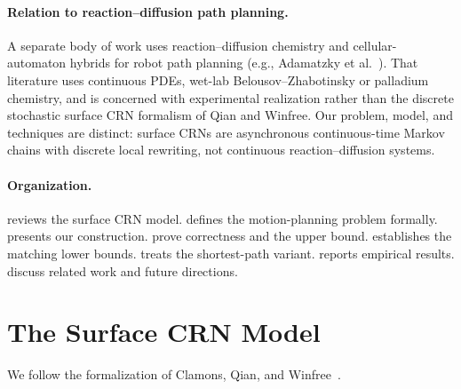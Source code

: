 \documentclass[11pt]{article}
\theoremstyle{plain}
\theoremstyle{definition}
\theoremstyle{remark}
\begin{document}
\paragraph{Relation to reaction--diffusion path planning.} A separate body of work uses reaction--diffusion chemistry and cellular-automaton hybrids for robot path planning (e.g., Adamatzky et al.~\cite{adamatzky2003,adamatzky2005}). That literature uses continuous PDEs, wet-lab Belousov--Zhabotinsky or palladium chemistry, and is concerned with experimental realization rather than the discrete stochastic surface CRN formalism of Qian and Winfree. Our problem, model, and techniques are distinct: surface CRNs are asynchronous continuous-time Markov chains with discrete local rewriting, not continuous reaction--diffusion systems.

\paragraph{Organization.}  reviews the surface CRN model.  defines the motion-planning problem formally.  presents our construction.  prove correctness and the upper bound.  establishes the matching lower bounds.  treats the shortest-path variant.  reports empirical results.  discuss related work and future directions.

\section{The Surface CRN Model}
\label{sec:model}

We follow the formalization of Clamons, Qian, and Winfree~\cite{clamons2020}.
\end{document}
